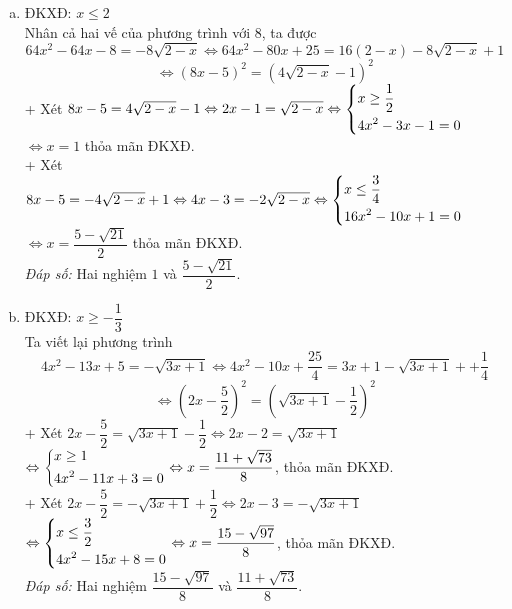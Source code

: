 \begin{bt}
{\begin{enumerate}[a)]
     		+ Xét $x+\dfrac{3}{2}=\sqrt{5x-3}+\dfrac{3}{2}\Leftrightarrow x=\sqrt{5x-3}$ 
     		$\Leftrightarrow x^2-5x+3=0 \Leftrightarrow x=\dfrac{5\pm \sqrt{13}}{2}$ thỏa  ĐKXĐ.\\
     		+ Xét $x+\dfrac{3}{2}=-\sqrt{5x-3}-\dfrac{3}{2}\Leftrightarrow x+3=-\sqrt{5x-3}$ vô nghiệm.\\
     		\textit{Đáp số:} Hai nghiệm $x=\dfrac{5\pm \sqrt{13}}{2}.$
     		\item ĐKXĐ: $x\le 2$\\
     		Nhân cả hai vế  của phương trình với 8, ta được $$64x^2-64x-8=-8\sqrt{2-x}\Leftrightarrow 64x^2-80x+25=16(2-x) -8\sqrt{2-x} +1$$ $$\Leftrightarrow{\left(8x-5\right)}^2 ={\left(4\sqrt{2-x}-1\right)}^2$$
     		+ Xét $8x-5=4\sqrt{2-x}-1\Leftrightarrow 2x-1=\sqrt{2-x}\Leftrightarrow \left\{\begin{aligned}& x\geq \dfrac{1}{2}\\ & 4x^2-3x-1=0\end{aligned}\right.$ \\
     		$\Leftrightarrow x=1$ thỏa mãn ĐKXĐ.
     		\\
     		+ Xét $8x-5=-4\sqrt{2-x}+1\Leftrightarrow 4x-3=-2\sqrt{2-x}\Leftrightarrow \left\{\begin{aligned}& x\leq \dfrac{3}{4}\\ & 16x^2-10x+1=0\end{aligned}\right.$ \\
     		$\Leftrightarrow x=\dfrac{5-\sqrt{21}}{2}$ thỏa mãn ĐKXĐ.\\
     		\textit{Đáp số:}  Hai nghiệm $1$ và $\dfrac{5-\sqrt{21}}{2}$.
     		\item ĐKXĐ: $x\ge -\dfrac{1}{3}$\\
     		Ta viết lại phương trình
     		$$
     		4x^2-13x+5=-\sqrt{3x+1}
     		\Leftrightarrow 
     		4x^2 -10x+\dfrac{25}{4}  =3x+1 -\sqrt{3x+1}++\dfrac{1}{4}
     		$$
     		$$
     		\Leftrightarrow {\left(2x-\dfrac{5}{2}\right)}^2={\left(\sqrt{3x+1}-\dfrac{1}{2}\right)}^2$$
     		+ Xét $2x-\dfrac{5}{2}=\sqrt{3x+1}-\dfrac{1}{2}\Leftrightarrow 2x -2=\sqrt{3x+1}$\\
     		$
     		\Leftrightarrow \left\{\begin{aligned}& x\ge 1\\ & 4x^2-11x +3=0\end{aligned}\right.\Leftrightarrow x=\dfrac{11+\sqrt{73}}{8}$, thỏa  mãn ĐKXĐ.\\
     		+ Xét $2x-\dfrac{5}{2}=-\sqrt{3x+1}+\dfrac{1}{2}\Leftrightarrow 2x -3=-\sqrt{3x+1}$\\
     		$
     		\Leftrightarrow \left\{\begin{aligned}& x\le \dfrac{3}{2}\\ & 4x^2-15x +8=0\end{aligned}\right.\Leftrightarrow x=\dfrac{15-\sqrt{97}}{8}$, thỏa  mãn ĐKXĐ.\\
     		\textit{Đáp số:}  Hai nghiệm $\dfrac{15-\sqrt{97}}{8}$ và $\dfrac{11+\sqrt{73}}{8}$.

\end{enumerate}}
\end{bt}
